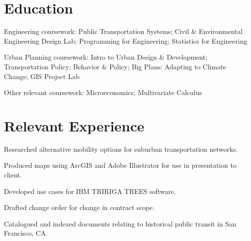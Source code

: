 \documentclass[11pt]{article}
\begin{document}
\maketitle

\section{Education}
\def\employer{Massachusetts Institute of Technology}
\def\location{Cambridge, MA}
\def\title{Bachelor of Science in Civil Engineering}
\def\dates{2014--June 2019}
\begin{position}
\item Engineering coursework: Public Transportation Systems; Civil \& Environmental Engineering Design Lab; Programming for Engineering; Statistics for Engineering
\item Urban Planning coursework: Intro to Urban Design \& Development; Transportation Policy; Behavior \& Policy; Big Plans: Adapting to Climate Change; GIS Project Lab
\item Other relevant coursework: Microeconomics; Multivariate Calculus
\end{position}

\section{Relevant Experience}
\def\employer{Arup}
\def\location{New York, NY}
\def\title{Transportation Planning Intern}
\def\dates{June--August 2017}
\begin{position}
\item Researched alternative mobility options for suburban transportation networks.
\item Produced maps using ArcGIS and Adobe Illustrator for use in presentation to client.
\end{position}

\def\employer{San Francisco Bay Area Rapid Transit District (BART)}
\def\location{Oakland, CA}
\def\title{Intern}
\def\dates{July--August 2015}
\begin{position}
\item Developed use cases for IBM TRIRIGA TREES software.
\item Drafted change order for change in contract scope.
\end{position}

\def\employer{Market Street Railway}
\def\location{San Francisco, CA}
\def\title{Volunteer}
\def\dates{Summers 2012--2013}
\begin{position}
\item Catalogued and indexed documents relating to historical public transit in San Francisco, CA.
\end{position}
\end{document}
